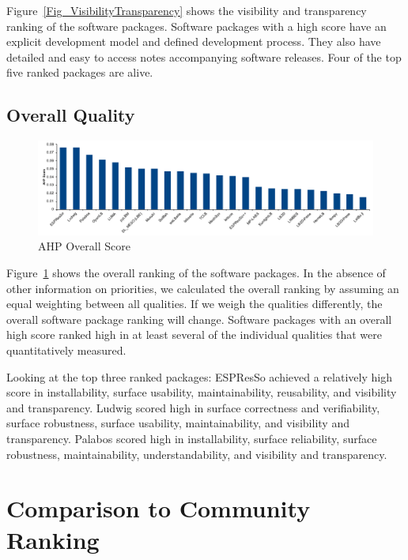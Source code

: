 \documentclass[final, 3p, times, authoryear]{elsarticle}
\begin{document}
Figure~\ref{Fig_VisibilityTransparency} shows the visibility and transparency
ranking of the software packages. Software packages with a high score have an
explicit development model and defined development process. They also have
detailed and easy to access notes accompanying software releases. Four of the
top five ranked packages are alive.

\subsection{Overall Quality} \label{Sec_OverallQuality}

\begin{figure}[h!]
	\centering
		\includegraphics[width=1.0\textwidth]{./figures/finalscore_chart.pdf}
		\caption{AHP Overall Score}
		\label{Fig_OverallScore}
\end{figure}

Figure~\ref{Fig_OverallScore} shows the overall ranking of the software
packages. In the absence of other information on priorities, we calculated the
overall ranking by assuming an equal weighting between all qualities. If we
weigh the qualities differently, the overall software package ranking will
change. Software packages with an overall high score ranked high in at least
several of the individual qualities that were quantitatively measured. 

Looking at the top three ranked packages: ESPResSo achieved a relatively high
score in installability, surface usability, maintainability, reusability, and
visibility and transparency. Ludwig scored high in surface correctness and
verifiability, surface robustness, surface usability, maintainability, and
visibility and transparency. Palabos scored high in installability, surface
reliability, surface robustness, maintainability, understandability, and
visibility and transparency.

\section{Comparison to Community Ranking} \label{repmetrics}
\end{document}
